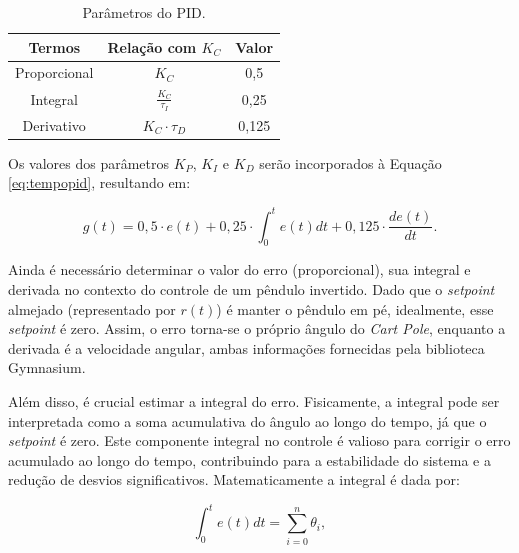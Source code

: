 \documentclass[12pt,           %
a4paper,                       %
openany,                       %
oneside,                       %
chapter=TITLE,                 %
english,                       %
spanish,                       %
brazil,                        %
sumario=tradicional]{abntex2}  %
\begin{document}
\begin{OnehalfSpace}
\begin{table}[H]
	\centering
	\vspace*{-.2cm}
	\caption{Parâmetros do PID.}
        \begin{tabular}{|c|c|c|} %
            \hline
            Termos & Relação com $K_C$ & Valor \\
            \hline
            Proporcional & $K_C$ & 0,5 \\
            \hline
            Integral & $\frac{K_C}{\tau_I}$ & 0,25 \\
            \hline
            Derivativo & $K_C \cdot \tau_D$ & 0,125 \\
            \hline
        \end{tabular}
        \label{tab:outlunarlander}                 %
    \end{table}
\vspace*{-0.65cm}
{\raggedright {}}

Os valores dos parâmetros $K_P$, $K_I$ e $K_D$ serão incorporados à Equação \ref{eq:tempopid}, resultando em:

\begin{equation}
     g(t) = 0,5 \cdot e(t) + 0,25\cdot \int_0^t e(t) dt + 0,125 \cdot \frac{de(t)}{dt}.
    \label{eq:tempopidv}
\end{equation}

Ainda é necessário determinar o valor do erro (proporcional), sua integral e derivada no contexto do controle de um pêndulo invertido. Dado que o \textit{setpoint} almejado (representado por \( r(t) \)) é manter o pêndulo em pé, idealmente, esse \textit{setpoint} é zero. Assim, o erro torna-se o próprio ângulo do \textit{Cart Pole}, enquanto a derivada é a velocidade angular, ambas informações fornecidas pela biblioteca Gymnasium.

Além disso, é crucial estimar a integral do erro. Fisicamente, a integral pode ser interpretada como a soma acumulativa do ângulo ao longo do tempo, já que o \textit{setpoint} é zero. Este componente integral no controle é valioso para corrigir o erro acumulado ao longo do tempo, contribuindo para a estabilidade do sistema e a redução de desvios significativos. Matematicamente a integral é dada por:

\begin{equation}
    \int_0^t e(t) dt = \sum_{i=0}^n \theta_i,
    \label{eq:integral}
\end{equation}


\end{OnehalfSpace}
\end{document}
